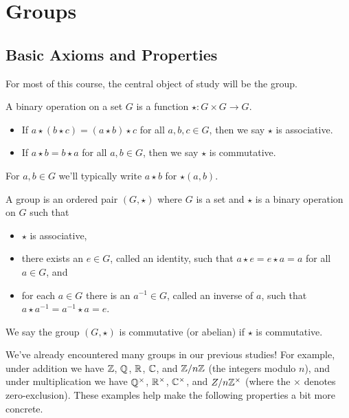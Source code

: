 \documentclass[../m171main.tex]{subfiles}
\begin{document}
\chapter{Groups}
\section{Basic Axioms and Properties}
For most of this course, the central object of study will be the group.

\begin{definition}
    A binary operation on a set $G$ is a function $\star : G \times G \to G$.
    \begin{itemize}
        \item If $a \star (b \star c) = (a \star b) \star c$ for all $a,b,c \in G$, then we say $\star$ is associative.
        \item If $a \star b = b \star a$ for all $a,b \in G$, then we say $\star$ is commutative.
    \end{itemize}
    For $a,b \in G$ we'll typically write $a \star b$ for $\star (a,b)$.
\end{definition}

\begin{definition}[Group]
    A group is an ordered pair $(G, \star)$ where $G$ is a set and $\star$ is a binary operation on $G$ such that
    \begin{itemize}
        \item $\star$ is associative,
        \item there exists an $e \in G$, called an identity, such that $a \star e = e \star a = a$ for all $a \in G$, and
        \item for each $a \in G$ there is an $a^{-1} \in G$, called an inverse of $a$, such that $a \star a^{-1} = a^{-1} \star a = e$.
    \end{itemize}
    We say the group $(G, \star)$ is commutative (or abelian) if $\star$ is commutative.
\end{definition}

We've already encountered many groups in our previous studies!
For example, under addition we have $\mathbb{Z}$, $\mathbb{Q}$, $\mathbb{R}$, $\mathbb{C}$, and $\mathbb{Z} / n\mathbb{Z}$ (the integers modulo $n$), and under multiplication we have $\mathbb{Q}^\times$, $\mathbb{R}^\times$, $\mathbb{C}^\times$, and $Z / n\mathbb{Z}^\times$ (where the $\times$ denotes zero-exclusion).
These examples help make the following properties a bit more concrete.
\end{document}
